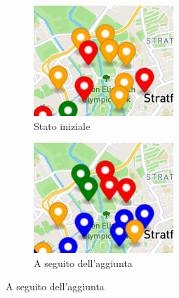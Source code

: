 \documentclass[a4paper, 12pt]{article}
\begin{document}
	\begin{figure}[!b]
	\centering
	\caption{Zona di mappa esempio 3}
	 \begin{subfigure}[b]{0.45\textwidth}
	\centering
	\includegraphics[width=\textwidth]{resources/images/screenshot/MapExample2.png}
    	\caption{Stato iniziale}	
    	\label{submap1}
 	\end{subfigure}\hfill
 	 \begin{subfigure}[b]{0.45\textwidth}
	\centering
    	\includegraphics[width=\textwidth]{resources/images/screenshot/MapExample3.png}
    	\caption{A seguito dell'aggiunta}
    	\label{submap2}
  	\end{subfigure}
	\end{figure}
\end{document}

